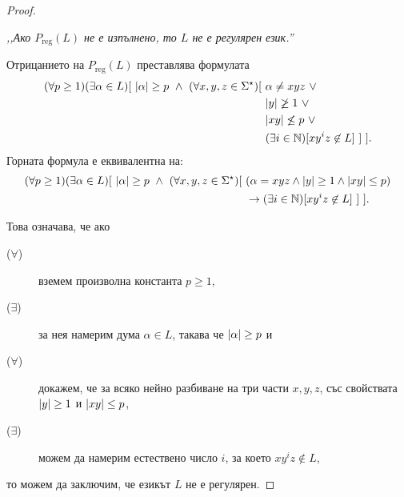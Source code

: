\begin{proof}
  \begin{center}
    {\em ,,Ако $P_{\text{reg}}(L)$ не е изпълнено, то $L$ не е регулярен език.''}
  \end{center}
  Отрицанието на $P_{\text{reg}}(L)$ преставлява формулата
  \begin{align*}
    (\forall p \geq 1)(\exists \alpha \in L)[\ \abs{\alpha} \geq p\ \land\ (\forall x,y,z\in\Sigma^\star)[\ & \alpha \neq xyz\ \lor\\
                                                                                                            & \abs{y} \not\geq 1\ \lor\\
                                                                                                            & \abs{xy} \not\leq p\ \lor\\
                                                                                                            & (\exists i\in\Nat)[xy^iz \not\in L]\ ]\ ].
  \end{align*}
  Горната формула е еквивалентна на:
  \begin{align*}
    (\forall p \geq 1)(\exists \alpha \in L)[\ \abs{\alpha} \geq p\ \land\ (\forall x,y,z\in\Sigma^\star)[\ & (\alpha = xyz \wedge \abs{y} \geq 1\wedge \abs{xy} \leq p)\\
                                                                                                            & \to (\exists i\in\Nat)[xy^iz \not\in L]\ ]\ ].
  \end{align*}

  Това означава, че ако
  \begin{description}
  \item[($\forall$)]
    вземем произволна константа $p \geq 1$,
  \item[($\exists$)]
    за нея намерим дума $\alpha \in L$, такава че $\lvert{\alpha}\rvert \geq p$ и 
  \item[($\forall$)]
    докажем, че за всяко нейно разбиване на три части $x,y,z$, със свойствата
    $\lvert{y}\rvert \geq 1$ и $\lvert{xy}\rvert \leq p$,
  \item[($\exists$)]
    можем да намерим естествено число $i$, за което $xy^iz \not\in L$,
  \end{description}
  то можем да заключим, че езикът $L$ не е регулярен.
\end{proof}

